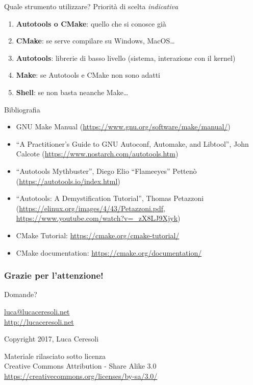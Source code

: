 \documentclass[xetex,table]{beamer}
\begin{document}
\begin{frame}{Quale strumento utilizzare?}
  Priorità di scelta {\em indicativa}
  \begin{enumerate}
  \item {\bf Autotools o CMake}: quello che si conosce già
  \item {\bf CMake}:             se serve compilare su Windows, MacOS\dots
  \item {\bf Autotools}:         librerie di basso livello (sistema, interazione con il kernel)
  \item {\bf Make}:              se Autotools e CMake non sono adatti
  \item {\bf Shell}:             se non basta neanche Make\dots
  \end{enumerate}
\end{frame}

\begin{frame}{Bibliografia}
  \small
  \begin{itemize}
  \item GNU Make Manual (\url{https://www.gnu.org/software/make/manual/})
  \item ``A Practitioner's Guide to GNU Autoconf, Automake, and Libtool'',
    John Calcote (\url{https://www.nostarch.com/autotools.htm})
  \item ``Autotools Mythbuster'', Diego Elio “Flameeyes” Pettenò
    (\url{https://autotools.io/index.html})
  \item ``Autotools: A Demystification Tutorial'', Thomas Petazzoni
    (\url{https://elinux.org/images/4/43/Petazzoni.pdf},
    \url{https://www.youtube.com/watch?v=_zX8LJ9Xjyk})
  \item CMake Tutorial: \url{https://cmake.org/cmake-tutorial/}
  \item CMake documentation: \url{https://cmake.org/documentation/}
  \end{itemize}
\end{frame}

\begin{frame}
  \frametitle{Grazie per l'attenzione!}

  \begin{center}
    {\Huge Domande?}

    \vspace{0.1\textheight}

    \href{mailto:luca@lucaceresoli.net}{luca@lucaceresoli.net}\\
    \url{http://lucaceresoli.net}

    \textcopyright{} Copyright 2017, Luca Ceresoli\\

    \vspace{0.2\textheight}

    \tiny
    Materiale rilasciato sotto licenza\\
    Creative Commons Attribution - Share Alike 3.0 \\
    \url{https://creativecommons.org/licenses/by-sa/3.0/} \\
\end{center}
\end{frame}
\end{document}
